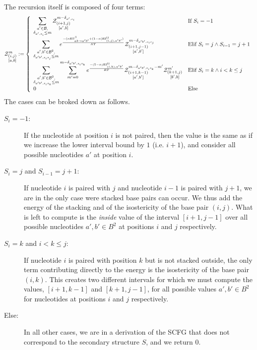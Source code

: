The recursion itself is composed of four terms:
$$
	\Z{i,j}{m}{a,b}:=\left\{
  \begin{array}{ll}
  		\displaystyle
      \sum_{\substack{a'\in \B,\\ \Kron_{a',s_i}\le m}}  
      \Z{i+1,j}{m-\Kron_{a',s_i}}{a',b} & \text{If }S_{i}=-1\\
      \displaystyle
      \sum_{\substack{a',b'\in \B^2,\\ \Kron_{a'b',s_is_j}\le m}}
			 e^{\frac{-(\alpha \text{ES}^\beta_{a b \to a' b'}+(1-\alpha)\text{EI}^{\Omega}_{(i,j),a'b'})}{RT}}
			 \Z{i+1,j-1}{m-\Kron_{a'b',s_is_j}}{a',b'}&
			 \text{Elif }S_i=j \land S_{i-1}=j+1\\
			 \displaystyle
      \sum_{\substack{a',b'\in \B^2,\\ \Kron_{a'b',s_is_k}\le m}}
      \sum_{m'=0}^{m-\Kron_{a'b',s_is_k}}
   		 e^{\frac{-(1-\alpha)\text{EI}^{\Omega}_{(i,k),a'b'}}{RT}}
      \Z{i+1,k-1}{m-\Kron_{a'b',s_is_k}-m'}{a',b'}
      \Z{k+1,j}{m'}{b',b} & \text{Elif }S_i=k \land i < k \leq j\\
      0 &\text{Else}
	\end{array}\right.
$$
The cases can be broked down as follows.
\begin{description}
\item[$S_{i}=-1$:] If the nucleotide at position $i$ is not paired, then the value is the same
as if we increase the lower interval bound by $1$ (i.e. $i+1$), and consider all possible
 nucleotides $a'$ at position $i$. 
\item[$S_i=j$ and $S_{i-1}=j+1$:] If nucleotide $i$ is paired with $j$ and nucleotide $i-1$ is
paired with $j+1$, we are in the only case were stacked base pairs can occur. We thus add
the energy of the stacking and of the isostericity of the base pair $(i,j)$. What is left
to compute is the \emph{inside} value of the interval $[i+1,j-1]$ over all possible nucleotides 
$a',b'\in B^2$ at positions $i$ and $j$ respectively.
\item[$S_i=k$ and $i<k \leq j$:] If nucleotide $i$ is paired with position $k$ 
but is not stacked outside, the 
only term contributing directly to the energy is the isostericity of the base pair $(i,k)$. This 
creates
two different intervals for which we must compute the values, $[i+1,k-1]$ and $[k+1,j-1]$, for 
all possible values $a',b'\in B^2$ for nucleotides at positions $i$ and $j$ respectively.
\item[Else:] In all other cases, we are in a derivation of the SCFG that does not correspond to the 
secondary structure $S$, and we return $0$.

\end{description}

